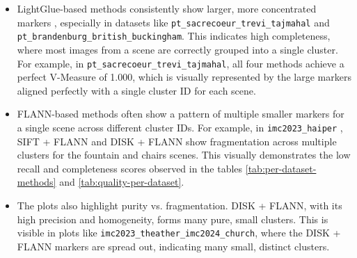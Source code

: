 \documentclass[report.tex]{subfiles}
\begin{document}
\begin{itemize}
    \item  LightGlue-based methods consistently show larger, more concentrated markers , especially in datasets like \texttt{pt\_sacrecoeur\_trevi\_tajmahal} and \texttt{pt\_brandenburg\_british\_buckingham}. This indicates high completeness, where most images from a scene are correctly grouped into a single cluster. For example, in \texttt{pt\_sacrecoeur\_trevi\_tajmahal}, all four methods achieve a perfect V-Measure of 1.000, which is visually represented by the large markers aligned perfectly with a single cluster ID for each scene.
    \item  FLANN-based methods often show a pattern of multiple smaller markers for a single scene across different cluster IDs. For example, in \texttt{imc2023\_haiper} , SIFT + FLANN and DISK + FLANN show fragmentation across multiple clusters for the fountain and chairs scenes. This visually demonstrates the low recall and completeness scores observed in the tables \ref{tab:per-dataset-methods} and \ref{tab:quality-per-dataset}.
    \item The plots also highlight purity vs. fragmentation. DISK + FLANN, with its high precision and homogeneity, forms many pure, small clusters. This is visible in plots like \texttt{imc2023\_theather\_imc2024\_church}, where the DISK + FLANN markers are spread out, indicating many small, distinct clusters.
\end{itemize}




\end{document}
